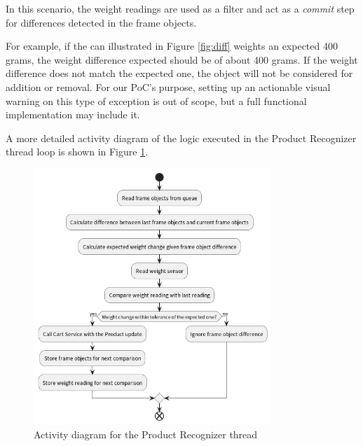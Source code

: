 \documentclass[openright]{normas-utf-tex} %
\begin{document}
In this scenario, the weight readings are used as a filter and act as a
\textit{commit} step for differences detected in the frame objects.

For example, if the can illustrated in Figure \ref{fig:diff} weights an expected 400 grams, the weight
difference expected should be of about 400 grams. If the weight difference does not match the expected
one, the object will not be considered for addition or removal. For our PoC's purpose, setting up an 
actionable visual warning on this type of exception is out of scope, but a full functional implementation
may include it.

A more detailed activity diagram of the logic executed in the Product Recognizer thread loop is
shown in Figure \ref{fig:activity}.

\begin{figure}[H]
	\centering
	\includegraphics[width=0.8\textwidth]{./images/Product Recognizer Activity.png}
	\caption[Activity diagram for the Product Recognizer thread]{Activity diagram for the Product Recognizer thread}
    \label{fig:activity}
\end{figure}
\end{document}
